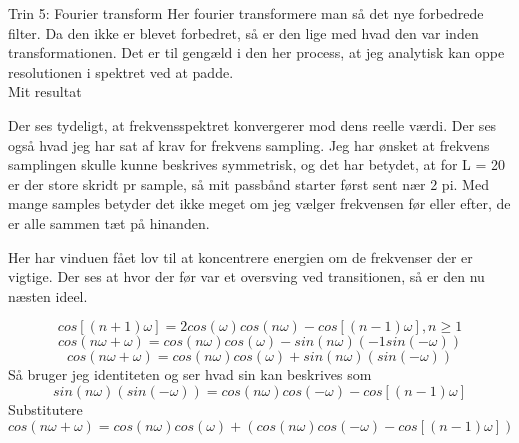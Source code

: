\begin{Opgaver}
\begin{kapitel}
\begin{Opgave}[Opgave 10.11 - Consider an ideal lowpass filter with cutoff frequency \text{$w_c = \pi/2$}]
\begin{UnderOpgave}[Using L = 20 samples around the unit circle, compute the resulting impulse response hn using the rectangular window.]
                Trin 5: Fourier transform
                Her fourier transformere man så det nye forbedrede filter. Da den ikke er blevet forbedret, 
                så er den lige med hvad den var inden transformationen. 
                Det er til gengæld i den her process, at jeg analytisk kan oppe resolutionen i spektret ved at padde. \\
                Mit resultat
            \end{UnderOpgave}
            \begin{UnderOpgave}[Brug L = 400 og sammenlign med tidligere resultater]
                Der ses tydeligt, at frekvensspektret konvergerer mod dens reelle værdi. 
                Der ses også hvad jeg har sat af krav for frekvens sampling. 
                Jeg har ønsket at frekvens samplingen skulle kunne beskrives symmetrisk, og det har betydet, at for L = 20 er der store skridt pr sample, 
                så mit passbånd starter først sent nær 2 pi. 
                Med mange samples betyder det ikke meget om jeg vælger frekvensen før eller efter, de er alle sammen tæt på hinanden. 
            \end{UnderOpgave}
            \begin{UnderOpgave}
                Her har vinduen fået lov til at koncentrere energien om de frekvenser der er vigtige.
                Der ses at hvor der før var et oversving ved transitionen, så er den nu næsten ideel. 
            \end{UnderOpgave}
        \end{Opgave}
        \begin{Opgave}
            \begin{UnderOpgave}[Using the trigonometric identity cos(A + B) = cos(A)cos(B) - sin(A)sin(B) show that]
                \[cos[(n + 1)\omega] = 2cos(\omega)cos(n\omega) - cos[(n - 1)\omega], n \geq 1 \]
                \[cos(n\omega + \omega) = cos(n\omega)cos(\omega) - sin(n\omega)(-1sin(-\omega))\]
                \[cos(n\omega + \omega) = cos(n\omega)cos(\omega) + sin(n\omega)(sin(-\omega))\]
                Så bruger jeg identiteten og ser hvad sin kan beskrives som
                \[sin(n\omega)(sin(-\omega)) = cos(n\omega)cos(-\omega) - cos[(n - 1)\omega]\]
                Substitutere
                \[cos(n\omega + \omega) = cos(n\omega)cos(\omega) + (cos(n\omega)cos(-\omega) - cos[(n - 1)\omega])\]

\end{UnderOpgave}
\end{Opgave}
\end{kapitel}
\end{Opgaver}
